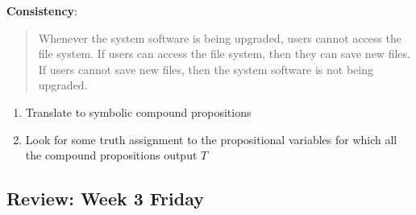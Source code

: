 \documentclass[12pt, oneside]{article}
\begin{document}
{\bf Consistency}: 
\begin{quote}
Whenever the system software is being upgraded, users cannot access the file system. 
If users can access the file system, then they can save new files. 
If users cannot save new files, then the system software is not being upgraded.
\end{quote}

\begin{enumerate}
\item Translate to symbolic compound propositions
\vfill
\item Look for some truth assignment to the propositional variables for which all the compound propositions output $T$
\vfill
\end{enumerate} \newpage
\subsection*{Review: Week 3 Friday}
\end{document}
